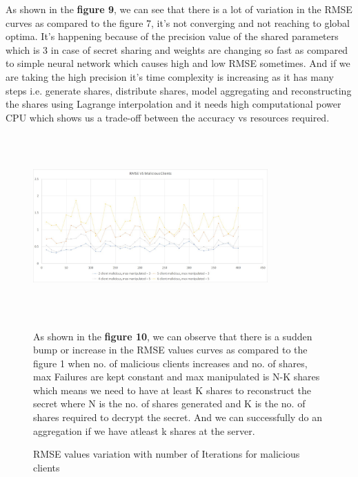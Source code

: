 \documentclass[conference]{IEEEtran}
\begin{document}
As shown in the \textbf{figure 9}, we can see that there is a lot of variation in the RMSE curves as compared to the figure 7, it's not converging and not reaching to global optima. It's happening because of the precision value of the shared parameters which is 3 in case of secret sharing and weights are changing so fast as compared to simple neural network which causes high and low RMSE sometimes. And if we are taking the high precision it's time complexity is increasing as it has many steps i.e. generate shares, distribute shares, model aggregating and reconstructing the shares using Lagrange interpolation and it needs high computational power CPU which shows us a trade-off between the accuracy vs resources required.


\begin{figure}
\includegraphics[width=90mm,height=70mm,scale=0.7]{RMSE_Malicious_SecretSharing.jpeg}

\caption{ RMSE  values  variation  with  number  of  Iterations for malicious clients}

\vspace{\baselineskip}

As shown in the \textbf{figure 10}, we can observe that there is a sudden bump or increase in the RMSE values curves as compared to the figure 1 when no. of malicious clients increases and no. of shares, max Failures are kept constant and max manipulated is N-K shares which means we need to have at least K shares to reconstruct the secret where N is the no. of shares generated and K is the no. of shares required to decrypt the secret. And we can successfully do an aggregation if we have atleast k shares at the server. 

\end{figure}
\end{document}

